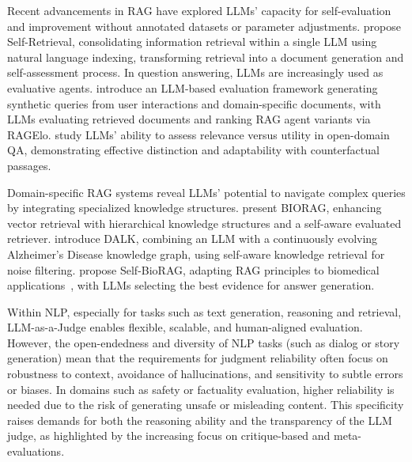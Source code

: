 Recent advancements in RAG have explored LLMs' capacity for self-evaluation and improvement without annotated datasets or parameter adjustments. 
\citet{tang2024self} propose Self-Retrieval, consolidating information retrieval within a single LLM using natural language indexing, transforming retrieval into a document generation and self-assessment process. 
In question answering, LLMs are increasingly used as evaluative agents. \citet{rackauckas2024evaluating} introduce an LLM-based evaluation framework generating synthetic queries from user interactions and domain-specific documents, with LLMs evaluating retrieved documents and ranking RAG agent variants via RAGElo. \citet{zhang2024large} study LLMs' ability to assess relevance versus utility in open-domain QA, demonstrating effective distinction and adaptability with counterfactual passages.

Domain-specific RAG systems reveal LLMs' potential to navigate complex queries by integrating specialized knowledge structures. \citet{wang2024biorag} present BIORAG, enhancing vector retrieval with hierarchical knowledge structures and a self-aware evaluated retriever. \citet{li2024dalk} introduce DALK, combining an LLM with a continuously evolving Alzheimer's Disease knowledge graph, using self-aware knowledge retrieval for noise filtering. \citet{jeong2024improving} propose Self-BioRAG, adapting RAG principles to biomedical applications~\citet{inno_bioinformatics_liu2023bioinformatics}, with LLMs selecting the best evidence for answer generation. 

Within NLP, especially for tasks such as text generation, reasoning and retrieval, LLM-as-a-Judge enables flexible, scalable, and human-aligned evaluation. However, the open-endedness and diversity of NLP tasks (such as dialog or story generation) mean that the requirements for judgment reliability often focus on robustness to context, avoidance of hallucinations, and sensitivity to subtle errors or biases. In domains such as safety or factuality evaluation, higher reliability is needed due to the risk of generating unsafe or misleading content. This specificity raises demands for both the reasoning ability and the transparency of the LLM judge, as highlighted by the increasing focus on critique-based and meta-evaluations. 


